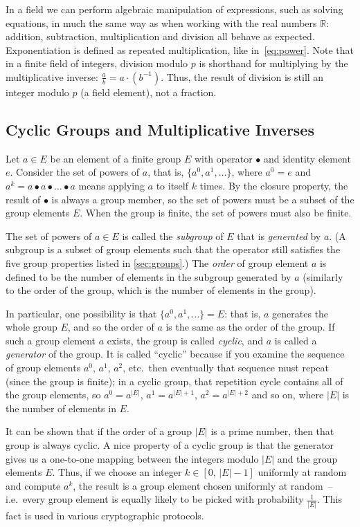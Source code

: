 \documentclass{article}
\begin{document}
In a field we can perform algebraic manipulation of expressions, such as solving equations, in much the same way as when working with the real numbers $\mathbb{R}$: addition, subtraction, multiplication and division all behave as expected.
Exponentiation is defined as repeated multiplication, like in~\eqref{eq:power}.
Note that in a finite field of integers, division modulo $p$ is shorthand for multiplying by the multiplicative inverse: $\frac{a}{b} = a \cdot (b^{-1})$.
Thus, the result of division is still an integer modulo $p$ (a field element), not a fraction.

\subsection{Cyclic Groups and Multiplicative Inverses}\label{sec:cyclic}

Let $a \in E$ be an element of a finite group $E$ with operator $\bullet$ and identity element $e$.
Consider the set of powers of $a$, that is, $\{a^0, a^1, \dots\}$, where $a^0 = e$ and $a^k = a \bullet a \bullet \dots \bullet a$ means applying $a$ to itself $k$ times.
By the closure property, the result of $\bullet$ is always a group member, so the set of powers must be a subset of the group elements $E$.
When the group is finite, the set of powers must also be finite.

The set of powers of $a \in E$ is called the \emph{subgroup} of $E$ that is \emph{generated} by $a$.
(A subgroup is a subset of group elements such that the operator still satisfies the five group properties listed in \autoref{sec:groups}.)
The \emph{order} of group element $a$ is defined to be the number of elements in the subgroup generated by $a$ (similarly to the order of the group, which is the number of elements in the group).

In particular, one possibility is that $\{a^0, a^1, \dots\} = E$: that is, $a$ generates the whole group $E$, and so the order of $a$ is the same as the order of the group.
If such a group element $a$ exists, the group is called \emph{cyclic}, and $a$ is called a \emph{generator} of the group.
It is called ``cyclic'' because if you examine the sequence of group elements $a^0$, $a^1$, $a^2$, etc.\ then eventually that sequence must repeat (since the group is finite); in a cyclic group, that repetition cycle contains all of the group elements, so $a^0 = a^{|E|}$, $a^1 = a^{|E|+1}$, $a^2 = a^{|E|+2}$ and so on, where $|E|$ is the number of elements in $E$.

It can be shown that if the order of a group $|E|$ is a prime number, then that group is always cyclic.
A nice property of a cyclic group is that the generator gives us a one-to-one mapping between the integers modulo $|E|$ and the group elements $E$.
Thus, if we choose an integer $k \in [0,\, |E|-1]$ uniformly at random and compute $a^k$, the result is a group element chosen uniformly at random~-- i.e.\ every group element is equally likely to be picked with probability $\frac{1}{|E|}$.
This fact is used in various cryptographic protocols.
\end{document}
